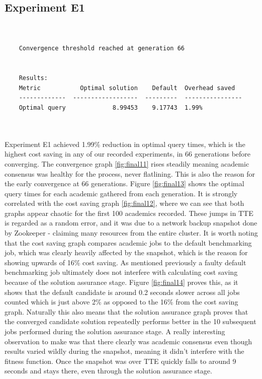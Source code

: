 \documentclass[a4paper,english]{report}
\begin{document}
	\subsection{Experiment E1}
	\begin{verbatim}
	
	
	Convergence threshold reached at generation 66
	
	
	Results:
	Metric           Optimal solution    Default  Overhead saved
	-------------  ------------------  ---------  ----------------
	Optimal query             8.99453    9.17743  1.99%
 
		
	\end{verbatim}
	Experiment E1 achieved 1.99\% reduction in optimal query times, which is the highest cost saving in any of our recorded experiments, in 66 generations before converging. The convergence graph \ref{fig:final11} rises steadily meaning academic consensus was healthy for the process, never flatlining. This is also the reason for the early convergence at 66 generations. Figure \ref{fig:final13} shows the optimal query times for each academic gathered from each generation. It is strongly correlated with the cost saving graph \ref{fig:final12}, where we can see that both graphs appear chaotic for the first 100 academics recorded. These jumps in TTE is regarded as a random error, and it was due to a network backup snapshot done by Zookeeper - claiming many resources from the entire cluster. It is worth noting that the cost saving graph compares academic jobs to the default benchmarking job, which was clearly heavily affected by the snapshot, which is the reason for showing upwards of 16\% cost saving. As mentioned previously a faulty default benchmarking job ultimately does not interfere with calculating cost saving because of the solution assurance stage. Figure \ref{fig:final14} proves this, as it shows that the default candidate is around 0.2 seconds slower across all jobs counted which is just above 2\% as opposed to the 16\% from the cost saving graph. Naturally this also means that the solution assurance graph proves that the converged candidate solution repeatedly performs better in the 10 subsequent jobs performed during the solution assurance stage. A really interesting observation to make was that there clearly was academic consensus even though results varied wildly during the snapshot, meaning it didn't interfere with the fitness function. Once the snapshot was over TTE quickly falls to around 9 seconds and stays there, even through the solution assurance stage.
	\clearpage
\end{document}
